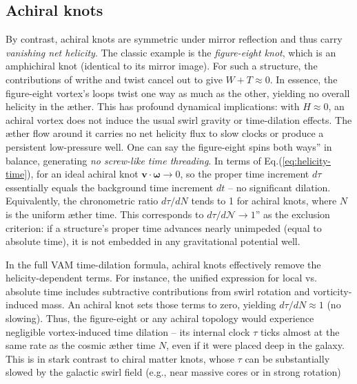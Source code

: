 \begin{center}
\end{center}


\subsection*{Achiral knots}
By contrast, achiral knots are symmetric under mirror reflection and thus carry \textit{vanishing net helicity}. The classic example is the \textit{figure-eight knot}, which is an amphichiral knot (identical to its mirror image). For such a structure, the contributions of writhe and twist cancel out to give $W+T \approx 0$. In essence, the figure-eight vortex's loops twist one way as much as the other, yielding no overall helicity in the \ae ther. This has profound dynamical implications: with $H \approx 0$, an achiral vortex does not induce the usual swirl gravity or time-dilation effects. The \ae ther flow around it carries no net helicity flux to slow clocks or produce a persistent low-pressure well. One can say the figure-eight spins both ways'' in balance, generating \textit{no screw-like time threading}. In terms of Eq.(\ref{eq:helicity-time}), for an ideal achiral knot $\mathbf{v}\cdot\boldsymbol{\omega}\to 0$, so the proper time increment $d\tau$ essentially equals the background time increment $dt$ -- no significant dilation. Equivalently, the chronometric ratio $d\tau/dN$ tends to 1 for achiral knots, where $N$ is the uniform \ae ther time. This corresponds to $d\tau/d\mathcal{N} \to 1$'' as the exclusion criterion: if a structure's proper time advances nearly unimpeded (equal to absolute time), it is not embedded in any gravitational potential well.


In the full VAM time-dilation formula, achiral knots effectively remove the helicity-dependent terms. For instance, the unified expression for local vs. absolute time includes subtractive contributions from swirl rotation and vorticity-induced mass. An achiral knot sets those terms to zero, yielding $d\tau/dN \approx 1$ (no slowing). Thus, the figure-eight or any achiral topology would experience negligible vortex-induced time dilation -- its internal clock $\tau$ ticks almost at the same rate as the cosmic \ae ther time $N$, even if it were placed deep in the galaxy. This is in stark contrast to chiral matter knots, whose $\tau$ can be substantially slowed by the galactic swirl field (e.g., near massive cores or in strong rotation)


